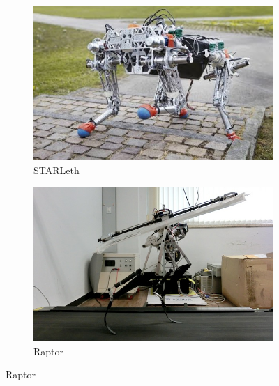 \begin{figure}[htb]
    \centering
    \begin{subfigure}[t]{0.40\textwidth}
        \includegraphics[width=\textwidth]{figures/starleth.jpg}
        \caption{STARLeth}
        \label{fig:starleth}
    \end{subfigure}
    \centering
    \begin{subfigure}[t]{0.40\textwidth}
        \includegraphics[width=\textwidth]{figures/biped_kaist.jpg}
        \caption{Raptor}
        \label{fig:kaist}
    \end{subfigure}
    \centering



\end{figure}
